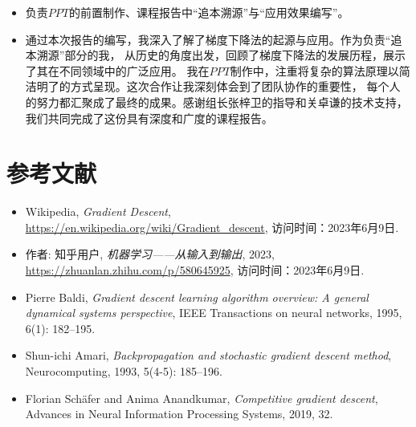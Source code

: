 \documentclass[printMode=true, declarePage=false]{ecnuthesis}
\begin{document}
\begin{acknowledgement}
\begin{itemize}
            \begin{itemize}
                \item 负责$PPT$的前置制作、课程报告中“追本溯源”与“应用效果编写”。
                \item 通过本次报告的编写，我深入了解了梯度下降法的起源与应用。作为负责“追本溯源”部分的我，
                从历史的角度出发，回顾了梯度下降法的发展历程，展示了其在不同领域中的广泛应用。
                我在$PPT$制作中，注重将复杂的算法原理以简洁明了的方式呈现。这次合作让我深刻体会到了团队协作的重要性，
                每个人的努力都汇聚成了最终的成果。感谢组长张梓卫的指导和关卓谦的技术支持，我们共同完成了这份具有深度和广度的课程报告。
            \end{itemize}
        \end{itemize}
    \end{acknowledgement}


\newpage
\section*{参考文献}
\begin{itemize}
    \item Wikipedia, \textit{Gradient Descent}, \url{https://en.wikipedia.org/wiki/Gradient_descent}, 访问时间：2023年6月9日.
    \item 作者: 知乎用户, \textit{机器学习——从输入到输出}, 2023, \url{https://zhuanlan.zhihu.com/p/580645925}, 访问时间：2023年6月9日.
    \item Pierre Baldi, \textit{Gradient descent learning algorithm overview: A general dynamical systems perspective}, IEEE Transactions on neural networks, 1995, 6(1): 182--195.
    \item Shun-ichi Amari, \textit{Backpropagation and stochastic gradient descent method}, Neurocomputing, 1993, 5(4-5): 185--196.
    \item Florian Schäfer and Anima Anandkumar, \textit{Competitive gradient descent}, Advances in Neural Information Processing Systems, 2019, 32.
\end{itemize}
\end{document}
